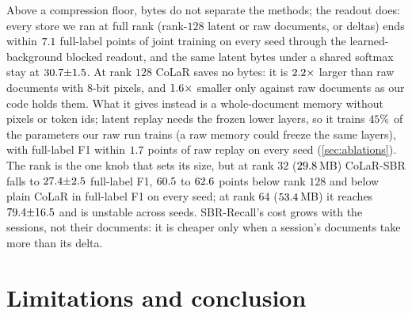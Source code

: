 \documentclass[10pt,twocolumn,letterpaper]{article}
\begin{document}
Above a compression floor, bytes do not separate the methods; the readout does: every store we ran at full rank (rank-$128$ latent or raw documents, or deltas) ends within $7.1$ full-label points of joint training on every seed through the learned-background blocked readout, and the same latent bytes under a shared softmax stay at $30.7{\pm}1.5$. At rank $128$ CoLaR saves no bytes: it is $2.2\times$ larger than raw documents with 8-bit pixels, and $1.6\times$ smaller only against raw documents as our code holds them. What it gives instead is a whole-document memory without pixels or token ids; latent replay needs the frozen lower layers, so it trains $45\%$ of the parameters our raw run trains (a raw memory could freeze the same layers), with full-label F1 within $1.7$ points of raw replay on every seed (\cref{sec:ablations}). The rank is the one knob that sets its size, but at rank $32$ ($29.8$\,MB) CoLaR-SBR falls to $27.4{\pm}2.5$ full-label F1, $60.5$ to $62.6$ points below rank $128$ and below plain CoLaR in full-label F1 on every seed; at rank $64$ ($53.4$\,MB) it reaches $79.4{\pm}16.5$ and is unstable across seeds. SBR-Recall's cost grows with the sessions, not their documents: it is cheaper only when a session's documents take more than its delta.

\section{Limitations and conclusion}
\label{sec:limitations}
\label{sec:conclusion}
\end{document}

